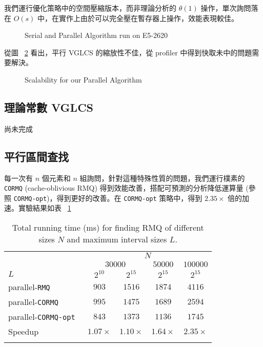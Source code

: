 \documentclass{gapd}
\begin{document}
我們運行優化策略中的空間壓縮版本，而非理論分析的 $\theta(1)$ 操作，單次詢問落在 $O(s)$ 中，在實作上由於可以完全壓在暫存器上操作，效能表現較佳。

\begin{figure}[!thb]
  \centering
  
  \caption{Serial and Parallel Algorithm run on E5-2620}
  \label{fig:fig-parallel}
\end{figure}

從圖 ~\ref{fig:fig-parallel-scala} 看出，平行 VGLCS 的縮放性不佳，從 profiler 中得到快取未中的問題需要解決。

\begin{figure}[!thb]
  \centering
  
  \caption{Scalability for our Parallel Algorithm}
  \label{fig:fig-parallel-scala}
\end{figure}

\subsection{理論常數 VGLCS}

尚未完成

\subsection{平行區間查找}

每一次有 $n$ 個元素和 $n$ 組詢問，針對這種特殊性質的問題，我們運行樸素的 \texttt{CORMQ} (cache-oblivious RMQ) 得到效能改善，搭配可預測的分析降低運算量 (參照 \texttt{CORMQ-opt})，得到更好的改善。在 \texttt{CORMQ-opt} 策略中，得到 $2.35 \times$ 倍的加速。實驗結果如表 ~\ref{tlb:CORMQ}

\begin{table}[!thb]
  \tiny
  \centering
  \begin{tabular}{l c c c c}
    \firsthline
      & \multicolumn{4}{c}{$N$} \\
      \cline{2-5}
        & \multicolumn{2}{c}{$30000$} & $50000$ & $100000$ \\
      $L$ & $2^{10}$ & $2^{15}$ & $2^{15}$ & $2^{15}$ \\
      \hline
      parallel-\tt{RMQ}     & $903$ & $1516$ & $1874$ & $4116$ \\
      parallel-\tt{CORMQ}   & $995$ & $1475$ & $1689$ & $2594$ \\
      parallel-\tt{CORMQ-opt} & $843$ & $1373$ & $1136$ & $1745$ \\
      \hline
      Speedup & $1.07\times$ & $1.10\times$ & $1.64\times$ & $2.35\times$\\
    \lasthline
  \end{tabular}
  \caption{Total running time (ms) for finding RMQ of different sizes $N$ and maximum interval sizes $L$.}
  \label{tlb:CORMQ}
\end{table}
\end{document}
